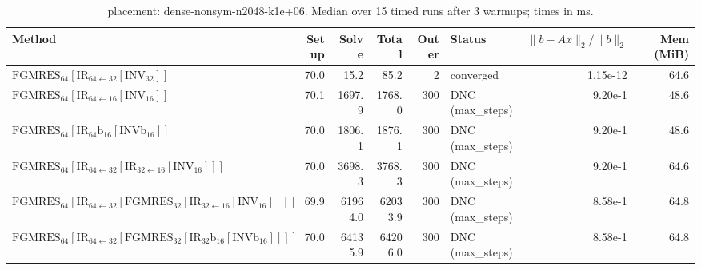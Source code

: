 \begin{table}[t]
\centering
\small
\caption{placement: dense-nonsym-n2048-k1e+06. Median over 15 timed runs after 3 warmups; times in ms.}
\label{tab:placement-dense-nonsym-n2048-k1e+06}
\begin{tabular}{lrrrrlrr}
\hline
Method & Setup & Solve & Total & Outer & Status & $\|b-Ax\|_2/\|b\|_2$ & Mem (MiB) \\
\hline
$\mathrm{FGMRES}_{64}[\mathrm{IR}_{64\leftarrow 32}[\mathrm{INV}_{32}]]$ & 70.0 & 15.2 & 85.2 & 2 & converged & 1.15e-12 & 64.6 \\
$\mathrm{FGMRES}_{64}[\mathrm{IR}_{64\leftarrow 16}[\mathrm{INV}_{16}]]$ & 70.1 & 1697.9 & 1768.0 & 300 & DNC (max_steps) & 9.20e-1 & 48.6 \\
$\mathrm{FGMRES}_{64}[\mathrm{IR}_{64}{\mathrm{b}_{16}}[\mathrm{INVb}_{16}]]$ & 70.0 & 1806.1 & 1876.1 & 300 & DNC (max_steps) & 9.20e-1 & 48.6 \\
$\mathrm{FGMRES}_{64}[\mathrm{IR}_{64\leftarrow 32}[\mathrm{IR}_{32\leftarrow 16}[\mathrm{INV}_{16}]]]$ & 70.0 & 3698.3 & 3768.3 & 300 & DNC (max_steps) & 9.20e-1 & 64.6 \\
$\mathrm{FGMRES}_{64}[\mathrm{IR}_{64\leftarrow 32}[\mathrm{FGMRES}_{32}[\mathrm{IR}_{32\leftarrow 16}[\mathrm{INV}_{16}]]]]$ & 69.9 & 61964.0 & 62033.9 & 300 & DNC (max_steps) & 8.58e-1 & 64.8 \\
$\mathrm{FGMRES}_{64}[\mathrm{IR}_{64\leftarrow 32}[\mathrm{FGMRES}_{32}[\mathrm{IR}_{32}{\mathrm{b}_{16}}[\mathrm{INVb}_{16}]]]]$ & 70.0 & 64135.9 & 64206.0 & 300 & DNC (max_steps) & 8.58e-1 & 64.8 \\
\hline
\end{tabular}
\end{table}
